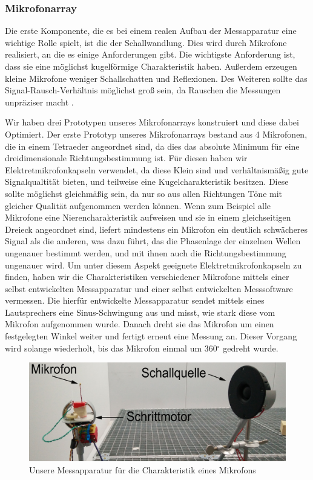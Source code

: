 \subsubsection{Mikrofonarray}
Die erste Komponente, die es bei einem realen Aufbau der Messapparatur eine wichtige Rolle spielt, ist die der Schallwandlung. Dies wird durch Mikrofone realisiert, an die es einige Anforderungen gibt. Die wichtigste Anforderung ist, dass sie eine möglichst kugelförmige Charakteristik haben.
Außerdem erzeugen kleine Mikrofone weniger Schallschatten und Reflexionen. Des Weiteren sollte das Signal-Rausch-Verhältnis möglichst groß sein, da Rauschen die Messungen unpräziser macht \cite{Rausch}.

Wir haben drei Prototypen unseres Mikrofonarrays konstruiert und diese dabei Optimiert. Der erste Prototyp unseres Mikrofonarrays bestand aus 4 Mikrofonen, die in einem Tetraeder angeordnet sind, da dies das absolute Minimum für eine dreidimensionale Richtungsbestimmung ist. Für diesen haben wir Elektretmikrofonkapseln verwendet, da diese Klein sind und verhältnismäßig gute Signalqualtität bieten, und teilweise eine Kugelcharakteristik besitzen. 
Diese sollte möglichst gleichmäßig sein, da nur so aus allen Richtungen Töne mit gleicher Qualität aufgenommen werden können. Wenn zum Beispiel alle Mikrofone eine Nierencharakteristik aufweisen und sie in einem gleichseitigen Dreieck angeordnet sind, liefert mindestens ein Mikrofon ein deutlich schwächeres Signal als die anderen, was dazu führt, das die Phasenlage der einzelnen Wellen ungenauer bestimmt werden, und mit ihnen auch die Richtungsbestimmung ungenauer wird.
Um unter diesem Aspekt geeignete Elektretmikrofonkapseln zu finden, haben wir die Charakteristiken verschiedener Mikrofone mittels einer selbst entwickelten Messapparatur und einer selbst entwickelten Messsoftware vermessen. Die hierfür entwickelte Messapparatur sendet mittels eines Lautsprechers eine Sinus-Schwingung aus und misst, wie stark diese vom Mikrofon aufgenommen wurde. Danach dreht sie das Mikrofon um einen festgelegten Winkel weiter und fertigt erneut eine Messung an. Dieser Vorgang wird solange wiederholt, bis das Mikrofon einmal um 360$^{\circ}$ gedreht wurde.
\begin{figure}[H]
  \centering
  \includegraphics[width=0.8\linewidth]{img/chara_mess}
  \caption{Unsere Messapparatur für die Charakteristik eines Mikrofons}
\end{figure}
